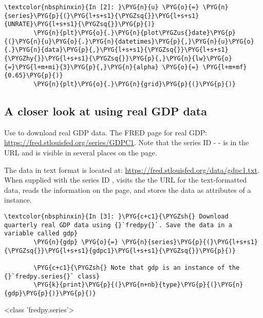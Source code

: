 \documentclass[letterpaper,10pt,openany,oneside,english]{sphinxmanual}
\begin{document}
\begin{Verbatim}[commandchars=\\\{\}]
\textcolor{nbsphinxin}{In [2]: }\PYG{n}{u} \PYG{o}{=} \PYG{n}{series}\PYG{p}{(}\PYG{l+s+s1}{\PYGZsq{}}\PYG{l+s+s1}{UNRATE}\PYG{l+s+s1}{\PYGZsq{}}\PYG{p}{)}
        \PYG{n}{plt}\PYG{o}{.}\PYG{n}{plot\PYGZus{}date}\PYG{p}{(}\PYG{n}{u}\PYG{o}{.}\PYG{n}{datetimes}\PYG{p}{,}\PYG{n}{u}\PYG{o}{.}\PYG{n}{data}\PYG{p}{,}\PYG{l+s+s1}{\PYGZsq{}}\PYG{l+s+s1}{\PYGZhy{}}\PYG{l+s+s1}{\PYGZsq{}}\PYG{p}{,}\PYG{n}{lw}\PYG{o}{=}\PYG{l+m+mi}{3}\PYG{p}{,}\PYG{n}{alpha} \PYG{o}{=} \PYG{l+m+mf}{0.65}\PYG{p}{)}
        \PYG{n}{plt}\PYG{o}{.}\PYG{n}{grid}\PYG{p}{(}\PYG{p}{)}
\end{Verbatim}

\noindent{}


\subsection{A closer look at  using real GDP data}
\label{\detokenize{fredpy_examples:A-closer-look-at-fredpy-using-real-GDP-data}}
Use  to download real GDP data. The FRED page for real GDP: \url{https://fred.stlouisfed.org/series/GDPC1}. Note that the series ID -  - is in the URL and is visible in several places on the page.

The data in text format is located at: \url{https://fred.stlouisfed.org/data/gdpc1.txt}. When supplied with the series ID ,  visits the the URL for the text-formatted data, reads the information on the page, and stores the data as attributes of a {\hyperref[\detokenize{series_class:fredpy.series}]{}} instance.

\begin{Verbatim}[commandchars=\\\{\}]
\textcolor{nbsphinxin}{In [3]: }\PYG{c+c1}{\PYGZsh{} Download quarterly real GDP data using {}`fredpy{}`. Save the data in a variable called gdp}
        \PYG{n}{gdp} \PYG{o}{=} \PYG{n}{series}\PYG{p}{(}\PYG{l+s+s1}{\PYGZsq{}}\PYG{l+s+s1}{gdpc1}\PYG{l+s+s1}{\PYGZsq{}}\PYG{p}{)}
        
        \PYG{c+c1}{\PYGZsh{} Note that gdp is an instance of the {}`fredpy.series{}` class}
        \PYG{k}{print}\PYG{p}{(}\PYG{n+nb}{type}\PYG{p}{(}\PYG{n}{gdp}\PYG{p}{)}\PYG{p}{)}
\end{Verbatim}
\begin{OriginalVerbatim}[commandchars=\\\{\}]
<class 'fredpy.series'>
\end{OriginalVerbatim}
\end{document}
